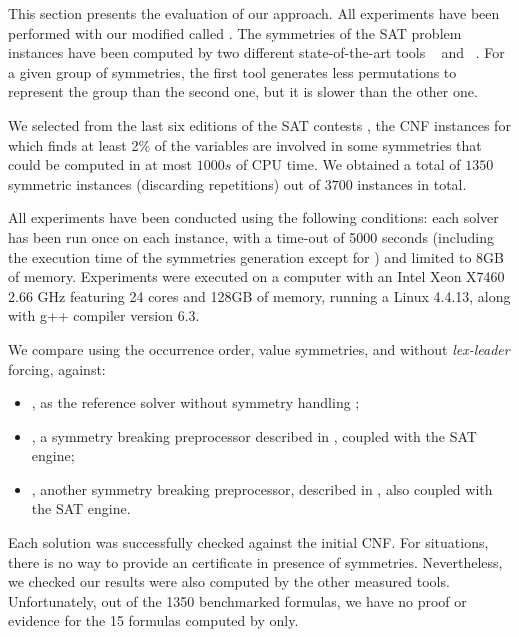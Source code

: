 This section presents the evaluation of our approach. All experiments have been
performed with our modified \minisat{} called \cdclsym{}. The symmetries of the
SAT problem instances have been computed by two different state-of-the-art
tools \saucy{}~\cite{katebi2010symmetry} and
\bliss{}~\cite{JunttilaKaski:ALENEX2007}. For a given group of symmetries, the
first tool generates less permutations to represent the group than the second
one, but it is slower than the other one.

We selected from the last six editions of the SAT contests
\cite{jarvisalo2012international}, the CNF instances for which \bliss{} finds
at least 2\% of the variables are involved in some symmetries that could be
computed in at most $1000s$ of CPU time. We obtained a total of $1350$
symmetric instances (discarding repetitions) out of $3700$ instances in total.

All experiments have been conducted using the following conditions: each solver
has been run once on each instance, with a time-out of 5000 seconds (including
the execution time of the symmetries generation except for \minisat) and limited
to 8GB of memory. Experiments were executed on a computer with an Intel Xeon
X7460 2.66 GHz featuring 24 cores and 128GB of memory, running a Linux 4.4.13,
along with g++ compiler version 6.3.

We compare \cdclsym{} using the occurrence order, value symmetries, and without
\emph{lex-leader} forcing, against:

\begin{itemize}
	
	\item \minisat{}, as the reference solver without symmetry handling
	\cite{een2003extensible};
	
	\item \shatter{}, a symmetry breaking preprocessor described in \cite{aloul06},
	coupled with the \minisat{} SAT engine;
	
	\item \breakid{}, another symmetry breaking preprocessor, described in
	\cite{devriendt2016improved}, also coupled with the \minisat{} SAT engine.
	
\end{itemize}

Each \sat solution was successfully checked against the initial CNF. For \unsat
situations, there is no way to provide an \unsat certificate in presence of
symmetries. Nevertheless, we checked our results were also computed by the
other measured tools. Unfortunately, out of the 1350 benchmarked formulas, we
have no proof or evidence for the 15 \unsat formulas computed by \cdclsym{}
only.

